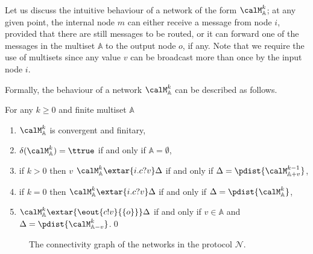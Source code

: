 \documentclass{LMCS}
\begin{document}
\noindent Let us discuss the intuitive behaviour of a network of the form 
$\calM^k_{\mathbb{A}}$; at any given point, the internal node 
$m$ can either receive a message from node $i$, provided that 
there are still messages to be routed, or it can forward 
one of the messages in the multiset $\mathbb{A}$ to the 
output node $o$, if any. Note that we require the use 
of multisets since any value $v$ 
can be broadcast more than once by the input node $i$.

Formally, the behaviour of a network $\calM^k_{\mathbb{A}}$ 
can be described as follows. 
\begin{prop}
\label{prop:routing.model.transitions}
For any $k \geq 0$ and finite multiset $\mathbb{A}$ 
\begin{enumerate}
\item $\calM^k_{\mathbb{A}}$ is convergent and finitary,
\item $\delta(\calM^k_{\mathbb{A}}) = \ttrue$ if and 
only if $\mathbb{A} = \emptyset$,
\item if $k > 0$ then $v$ 
$\calM^k_{\mathbb{A}} \extar{i.c?v} \Delta$ if and only 
if $\Delta = \pdist{\calM^{k-1}_{\mathbb{A} + v}}$, 
\item if $k=0$ then $\calM^k_{\mathbb{A}} \extar{i.c?v} 
\Delta$ if and only if $\Delta = \pdist{\calM^k_{\mathbb{A}}}$, 
\item $\calM^{k}_{\mathbb{A}}
\extar{\eout{c!v}{\{o\}}} \Delta$ if 
and only if $v \in \mathbb{A}$ and $\Delta = \pdist{\calM^{k}_{\mathbb{A} - v}}$.\qed
\end{enumerate}
\end{prop}

\begin{figure}
\caption{The connectivity graph of the networks in the protocol 
$\mathscr{N}$.}
\label{fig:routing.impl.conngraph}
\end{figure}
\end{document}
